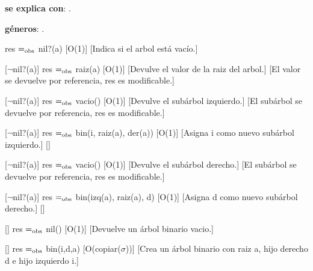 \begin{Interfaz}
  
  
  \textbf{se explica con}: .
  
  \textbf{g\'eneros}: .


  {res $=_{\mathrm{obs}}$ nil?(a)}
  [O(1)]
  [Indica si el arbol est\'a vac\'io.]

  [$\neg$nil?(a)]
  {res $=_{\mathrm{obs}}$ raiz(a)}
  [O(1)]
  [Devulve el valor de la raiz del arbol.]
  [El valor se devuelve por referencia, res es modificable.]
  
  [$\neg$nil?(a)]  
  {res $=_{\mathrm{obs}}$ vacio()}
  [O(1)]
  [Devulve el subárbol izquierdo.]
  [El subárbol se devuelve por referencia, res es modificable.]
  
  [$\neg$nil?(a)]  
  {res $=_{\mathrm{obs}}$ bin(i, raiz(a), der(a))}
  [O(1)]
  [Asigna i como nuevo subárbol izquierdo.]
  []
  
  [$\neg$nil?(a)]  
  {res $=_{\mathrm{obs}}$ vacio()}
  [O(1)]
  [Devulve el subárbol derecho.]
  [El subárbol se devuelve por referencia, res es modificable.]
  
  [$\neg$nil?(a)]  
  {res $=_{\mathrm{obs}}$ bin(izq(a), raiz(a), d)}
  [O(1)]
  [Asigna d como nuevo subárbol derecho.]
  []
  
  []
  {res $=_{\mathrm{obs}}$ nil()}
  [O(1)]
  [Devuelve un \'arbol binario vacio.]
  
  []
  {res $=_{\mathrm{obs}}$ bin(i,d,a)}
  [O(copiar($\sigma$))]
  [Crea un \'arbol binario con raiz a, hijo derecho d e hijo izquierdo i.]

\end{Interfaz}

\newpage 

